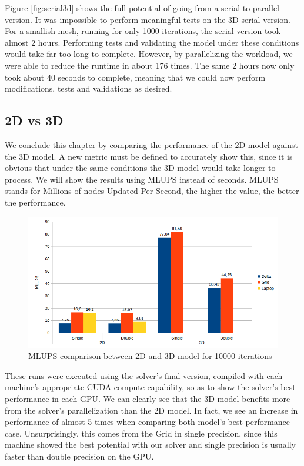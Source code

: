 \documentclass[12pt, openany]{book}
\begin{document}
    Figure \ref{fig:serial3d} shows the full potential of going from a serial to parallel version. It was impossible to perform meaningful tests on the 3D serial version. For a smallish mesh, running for only 1000 iterations, the serial version took almost 2 hours. Performing tests and validating the model under these conditions would take far too long to complete. However, by parallelizing the workload, we were able to reduce the runtime in about 176 times. The same 2 hours now only took about 40 seconds to complete, meaning that we could now perform modifications, tests and validations as desired.

\subsection{2D vs 3D}
We conclude this chapter by comparing the performance of the 2D model against the 3D model. A new metric must be defined to accurately show this, since it is obvious that under the same conditions the 3D model would take longer to process. We will show the results using MLUPS instead of seconds. MLUPS stands for Millions of nodes Updated Per Second, the higher the value, the better the performance. 

    \begin{figure}[H]
    	\centering
    	\includegraphics[width=\linewidth]{Resources/Images/2dv3d.png}
    	\caption{MLUPS comparison between 2D and 3D model for 10000 iterations}
    	\label{fig:2dv3d}
    \end{figure}

These runs were executed using the solver's final version, compiled with each machine's appropriate CUDA compute capability, so as to show the solver's best performance in each GPU. We can clearly see that the 3D model benefits more from the solver's parallelization than the 2D model. In fact, we see an increase in performance of almost 5 times when comparing both model's best performance case. Unsurprisingly, this comes from the Grid in single precision, since this machine showed the best potential with our solver and single precision is usually faster than double precision on the GPU. 
\end{document}
